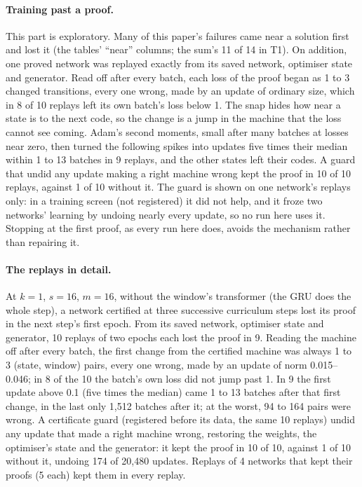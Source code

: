 \documentclass[11pt]{article}
\newcommand{\pn}[2]{#2}
\begin{document}
\paragraph{Training past a proof.} This part is exploratory. Many of this paper's failures came near a solution first and lost it
(the tables' ``near'' columns; the sum's \pn{k5.sum-near}{11 of 14} in T1). On addition,
one proved network was replayed exactly from its saved network, optimiser state and generator. Read off after every batch, each loss of the proof
began as \pn{replay.first-pairs}{1 to 3} changed transitions, every one wrong, made by an update of
ordinary size, which in \pn{replay.silent}{8} of \pn{replay.count}{10} replays left its own batch's
loss below 1. The snap hides how near a state is to the next
code, so the change is a jump in the machine that the loss cannot see coming. Adam's second moments,
small after many batches at losses near zero, then turned the following spikes into updates five
times their median within \pn{replay.amplified-within}{1 to 13} batches in \pn{replay.amplified}{9}
replays, and the other states left their codes. A guard that undid
any update making a right machine wrong kept the proof in \pn{guard.kept}{10} of 10 replays, against \pn{replay.kept}{1} of 10 without it.
The guard is shown on one network's replays only: in a training screen (not registered) it did not
help, and it froze two networks' learning by undoing nearly every update, so no run here uses it.
Stopping at the first proof, as every run here does, avoids the mechanism rather than repairing it.

\paragraph{The replays in detail.} At $k = 1$, $s = 16$, $m = 16$, without the window's
transformer (the GRU does the whole step), a network certified at three successive curriculum steps
lost its proof in the next step's first epoch. From its saved network, optimiser state and
generator, \pn{replay.count}{10} replays of two epochs each lost the proof in \pn{replay.lost}{9}.
Reading the machine off after every batch, the first change from the certified machine was always
\pn{replay.first-pairs}{1 to 3} (state, window) pairs, every one wrong, made by an update of norm
\pn{replay.first-norms}{0.015--0.046}; in \pn{replay.silent}{8} of the 10 the batch's own loss did
not jump past 1. In \pn{replay.amplified}{9} the first update above 0.1 (five times the median)
came \pn{replay.amplified-within}{1 to 13} batches after that first change, in the last only
\pn{replay.amplified-last}{1{,}512} batches after it; at the worst,
\pn{replay.worst-wrong}{94 to 164} pairs were wrong. A certificate guard (registered before its data, the same
\pn{guard.count}{10} replays) undid any update that made a right machine wrong, restoring the
weights, the optimiser's state and the generator: it kept the proof in \pn{guard.kept}{10} of 10,
against \pn{replay.kept}{1} of 10 without it, undoing \pn{guard.undone}{174} of
\pn{guard.batches}{20{,}480} updates. Replays of \pn{stable.networks}{4} networks that kept their
proofs (\pn{stable.each}{5} each) kept them in \pn{stable.kept}{every} replay.
\end{document}
